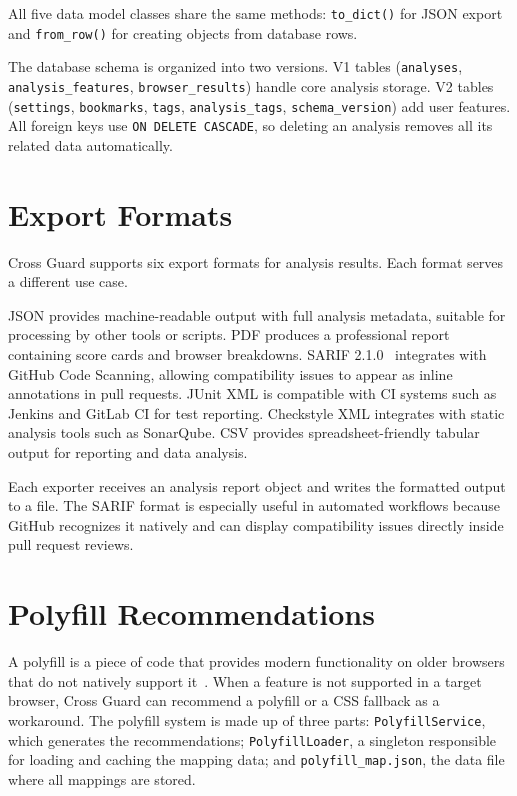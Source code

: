 All five data model classes share the same methods: \texttt{to\_dict()} for JSON export and \texttt{from\_row()} for creating objects from database rows.

The database schema is organized into two versions. V1 tables (\texttt{analyses}, \texttt{analysis\_features}, \texttt{browser\_results}) handle core analysis storage. V2 tables (\texttt{settings}, \texttt{bookmarks}, \texttt{tags}, \texttt{analysis\_tags}, \texttt{schema\_version}) add user features. All foreign keys use \texttt{ON DELETE CASCADE}, so deleting an analysis removes all its related data automatically.

\section{Export Formats}
\label{sec:export}

Cross Guard supports six export formats for analysis results. Each format serves a different use case.

JSON provides machine-readable output with full analysis metadata, suitable for processing by other tools or scripts. PDF produces a professional report containing score cards and browser breakdowns. SARIF 2.1.0~\cite{sarif210} integrates with GitHub Code Scanning, allowing compatibility issues to appear as inline annotations in pull requests. JUnit XML is compatible with CI systems such as Jenkins and GitLab CI for test reporting. Checkstyle XML integrates with static analysis tools such as SonarQube. CSV provides spreadsheet-friendly tabular output for reporting and data analysis.

Each exporter receives an analysis report object and writes the formatted output to a file. The SARIF format is especially useful in automated workflows because GitHub recognizes it natively and can display compatibility issues directly inside pull request reviews.

\section{Polyfill Recommendations}
\label{sec:polyfill}

A polyfill is a piece of code that provides modern functionality on older browsers that do not natively support it~\cite{sharp2010polyfill}. When a feature is not supported in a target browser, Cross Guard can recommend a polyfill or a CSS fallback as a workaround. The polyfill system is made up of three parts: \texttt{PolyfillService}, which generates the recommendations; \texttt{PolyfillLoader}, a singleton responsible for loading and caching the mapping data; and \texttt{polyfill\_map.json}, the data file where all mappings are stored.

